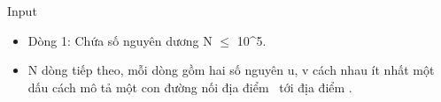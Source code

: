 Input
\begin{itemize}
	\item Dòng 1: Chứa số nguyên dương N  $\le$  10^5.
	\item N dòng tiếp theo, mỗi dòng gồm hai số nguyên u, v cách nhau ít nhất một dấu cách mô tả một con đường nối địa điểm  tới địa điểm .
\end{itemize}